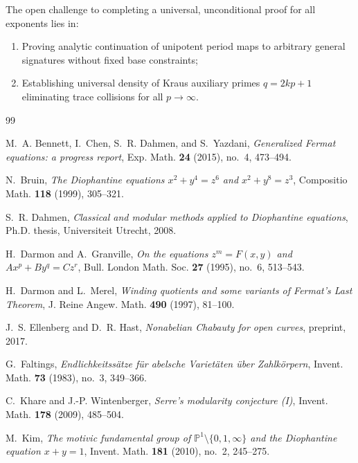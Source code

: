\documentclass[11pt,reqno]{amsart}
\theoremstyle{definition}
\theoremstyle{remark}
\numberwithin{equation}{section}
\begin{document}
The open challenge to completing a universal, unconditional proof for all exponents lies in:
\begin{enumerate}
    \item Proving analytic continuation of unipotent period maps to arbitrary general signatures without fixed base constraints;
    \item Establishing universal density of Kraus auxiliary primes $q = 2kp + 1$ eliminating trace collisions for all $p \to \infty$.
\end{enumerate}

\begin{thebibliography}{99}

M.~A. Bennett, I.~Chen, S.~R. Dahmen, and S.~Yazdani,
\emph{Generalized Fermat equations: a progress report},
Exp. Math. \textbf{24} (2015), no.~4, 473--494.

N.~Bruin,
\emph{The Diophantine equations $x^2 + y^4 = z^6$ and $x^2 + y^8 = z^3$},
Compositio Math. \textbf{118} (1999), 305--321.

S.~R. Dahmen,
\emph{Classical and modular methods applied to Diophantine equations},
Ph.D. thesis, Universiteit Utrecht, 2008.

H.~Darmon and A.~Granville,
\emph{On the equations $z^m = F(x, y)$ and $Ax^p + By^q = Cz^r$},
Bull. London Math. Soc. \textbf{27} (1995), no.~6, 513--543.

H.~Darmon and L.~Merel,
\emph{Winding quotients and some variants of Fermat's Last Theorem},
J. Reine Angew. Math. \textbf{490} (1997), 81--100.

J.~S. Ellenberg and D.~R. Hast,
\emph{Nonabelian Chabauty for open curves},
preprint, 2017.

G.~Faltings,
\emph{Endlichkeitss\"{a}tze f\"{u}r abelsche Variet\"{a}ten \"{u}ber Zahlk\"{o}rpern},
Invent. Math. \textbf{73} (1983), no.~3, 349--366.

C.~Khare and J.-P. Wintenberger,
\emph{Serre's modularity conjecture (I)},
Invent. Math. \textbf{178} (2009), 485--504.

M.~Kim,
\emph{The motivic fundamental group of $\mathbb{P}^1 \setminus \{0, 1, \infty\}$ and the Diophantine equation $x + y = 1$},
Invent. Math. \textbf{181} (2010), no.~2, 245--275.


\end{thebibliography}
\end{document}

